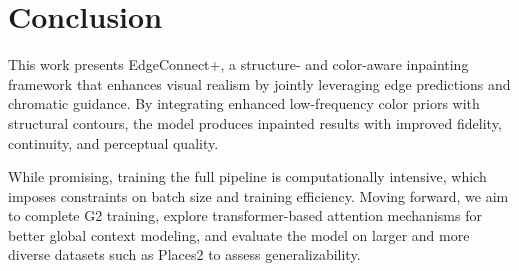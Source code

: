 \documentclass[10pt,twocolumn,letterpaper]{article}
\begin{document}
\section{Conclusion}

This work presents EdgeConnect+, a structure- and color-aware inpainting framework that enhances visual realism by jointly leveraging edge predictions and chromatic guidance. By integrating enhanced low-frequency color priors with structural contours, the model produces inpainted results with improved fidelity, continuity, and perceptual quality.

While promising, training the full pipeline is computationally intensive, which imposes constraints on batch size and training efficiency. Moving forward, we aim to complete G2 training, explore transformer-based attention mechanisms for better global context modeling, and evaluate the model on larger and more diverse datasets such as Places2 to assess generalizability.




\end{document}
